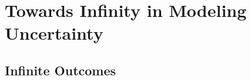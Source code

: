 \documentclass[6008notes.tex]{subfiles}
\begin{document}
\graphicspath{ {images/toinf/} }

\section{Towards Infinity in Modeling Uncertainty}

\subsection{Infinite Outcomes}
\end{document}
